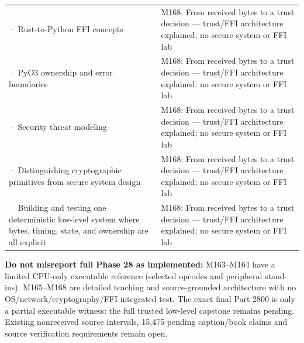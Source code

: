 {\begin{longtable}[]{@{}
  >{\raggedright\arraybackslash}p{}
  >{\raggedright\arraybackslash}p{}@{}}
2796 · Rust-to-Python FFI concepts & M168: From received bytes to a trust decision --- trust/FFI architecture explained; no secure system or FFI lab \\
2797 · PyO3 ownership and error boundaries & M168: From received bytes to a trust decision --- trust/FFI architecture explained; no secure system or FFI lab \\
2798 · Security threat modeling & M168: From received bytes to a trust decision --- trust/FFI architecture explained; no secure system or FFI lab \\
2799 · Distinguishing cryptographic primitives from secure system design & M168: From received bytes to a trust decision --- trust/FFI architecture explained; no secure system or FFI lab \\
2800 · Building and testing one deterministic low-level system where bytes, timing, state, and ownership are all explicit & M168: From received bytes to a trust decision --- trust/FFI architecture explained; no secure system or FFI lab \\
\end{longtable}
}

\textbf{Do not misreport full Phase 28 as implemented:} M163--M164 have a limited CPU-only executable reference (selected opcodes and peripheral stand-ins). M165--M168 are detailed teaching and source-grounded architecture with no OS/network/cryptography/FFI integrated test. The exact final Part 2800 is only a partial executable witness: the full trusted low-level capstone remains pending. Existing nonreceived source intervals, 15,475 pending caption/book claims and source verification requirements remain open.
